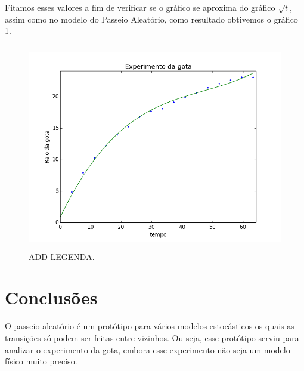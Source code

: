\documentclass[12pt,a4paper]{article}
\begin{document}
Fitamos esses valores a fim de verificar se o gráfico se aproxima do gráfico $\sqrt{t}$, assim como no modelo do Passeio Aleatório, como resultado obtivemos o gráfico \ref{gota}.

\begin{figure}[H]
\centering
\includegraphics[width=12cm,height=9cm]{imgs/raio_gota.png}
\caption{ADD LEGENDA.}
\label{gota}
\end{figure}

\newpage
\section{Conclusões}
O passeio aleatório é um protótipo para vários modelos estocásticos os quais
as transições só podem ser feitas entre vizinhos. Ou seja, esse protótipo serviu para analizar o experimento da gota, embora esse experimento não seja um modelo físico muito preciso.
\end{document}
